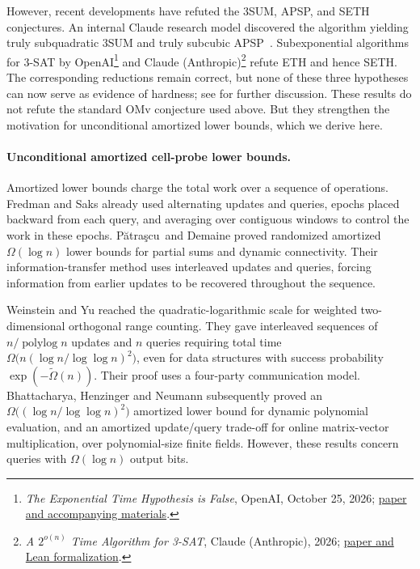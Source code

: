 \documentclass[11pt]{article}
\theoremstyle{plain}
\newcommand{\polylog}{\operatorname{polylog}}
\newcommand{\Patrascu}{P\u{a}tra\c{s}cu}
\begin{document}
However, recent developments have refuted the 3SUM, APSP, and SETH conjectures. An internal Claude research model discovered the algorithm yielding truly subquadratic 3SUM and truly subcubic APSP~\cite{alman_truly_2026}. Subexponential algorithms for 3-SAT by OpenAI\footnote{\emph{The Exponential Time Hypothesis is False}, OpenAI, October 25, 2026; \href{https://github.com/openai/math/blob/main/preprints/The-Exponential-Time-Hypothesis-is-False-October-25-2026/README.md}{paper and accompanying materials}.} and Claude (Anthropic)\footnote{\emph{A $2^{o(n)}$ Time Algorithm for 3-SAT}, Claude (Anthropic), 2026; \href{https://github.com/anthropics/formal-math/blob/main/eth/README.md}{paper and Lean formalization}.} refute ETH and hence SETH. The corresponding reductions remain correct, but none of these three hypotheses can now serve as evidence of hardness; see \cite{ko_omegalog_2026} for further discussion. These results do not refute the standard OMv conjecture used above. But they strengthen the motivation for unconditional amortized lower bounds, which we derive here.

\paragraph{Unconditional amortized cell-probe lower bounds.}
Amortized lower bounds charge the total work over a sequence of operations. Fredman and Saks \cite{fredman_cell_1989} already used alternating updates and queries, epochs placed backward from each query, and averaging over contiguous windows to control the work in these epochs. \Patrascu\ and Demaine \cite{patrascu_logarithmic_2006} proved randomized amortized $\Omega(\log n)$ lower bounds for partial sums and dynamic connectivity. Their information-transfer method uses interleaved updates and queries, forcing information from earlier updates to be recovered throughout the sequence.

Weinstein and Yu \cite{weinstein_amortized_2016} reached the quadratic-logarithmic scale for weighted two-dimensional orthogonal range counting. They gave interleaved sequences of $n/\polylog n$ updates and $n$ queries requiring total time $\Omega\big(n(\log n/\log\log n)^2\big)$, even for data structures with success probability $\exp(-\widetilde\Omega(n))$. Their proof uses a four-party communication model. Bhattacharya, Henzinger and Neumann \cite{bhattacharya_new_2019} subsequently proved an $\Omega\big((\log n/\log\log n)^2\big)$ amortized lower bound for dynamic polynomial evaluation, and an amortized update/query trade-off for online matrix-vector multiplication, over polynomial-size finite fields. However, these results concern queries with $\Omega(\log n)$ output bits.
\end{document}
